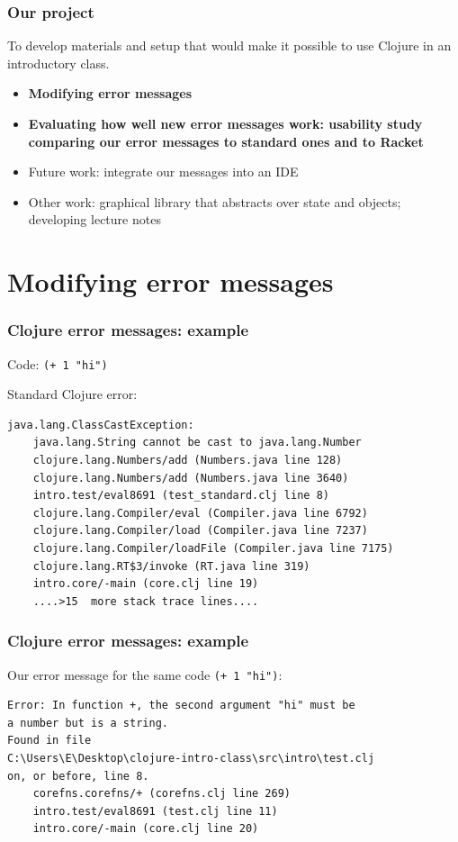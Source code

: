 \documentclass{beamer}
\begin{document}
\begin{frame}
\frametitle{ Our project}
To develop materials and setup that would make it possible to use Clojure in an introductory class. 
\begin{itemize}
\item {\bf Modifying error messages}
\item {\bf Evaluating how well new error messages work: usability study comparing our error messages to standard ones and to Racket}
\item Future work: integrate our messages into an IDE
\item Other work: graphical library that abstracts over state and objects; developing lecture notes 
\end{itemize}
\end{frame}

\section{Modifying error messages}

\begin{frame}[fragile]
\frametitle{ Clojure error messages: example}
Code: {\tt (+ 1 "hi")}

Standard Clojure error:
\begin{verbatim}
java.lang.ClassCastException: 
	java.lang.String cannot be cast to java.lang.Number
	clojure.lang.Numbers/add (Numbers.java line 128)
	clojure.lang.Numbers/add (Numbers.java line 3640)
	intro.test/eval8691 (test_standard.clj line 8)
	clojure.lang.Compiler/eval (Compiler.java line 6792)
	clojure.lang.Compiler/load (Compiler.java line 7237)
	clojure.lang.Compiler/loadFile (Compiler.java line 7175)
	clojure.lang.RT$3/invoke (RT.java line 319)
	intro.core/-main (core.clj line 19)
	....>15  more stack trace lines....
\end{verbatim}
\end{frame}

\begin{frame}[fragile]
\frametitle{ Clojure error messages: example}
Our error message for the same code  {\tt (+ 1 "hi")}:
\begin{verbatim}
Error: In function +, the second argument "hi" must be 
a number but is a string.
Found in file 
C:\Users\E\Desktop\clojure-intro-class\src\intro\test.clj 
on, or before, line 8.
	corefns.corefns/+ (corefns.clj line 269)
	intro.test/eval8691 (test.clj line 11)
	intro.core/-main (core.clj line 20)
\end{verbatim}
\end{frame}
\end{document}
